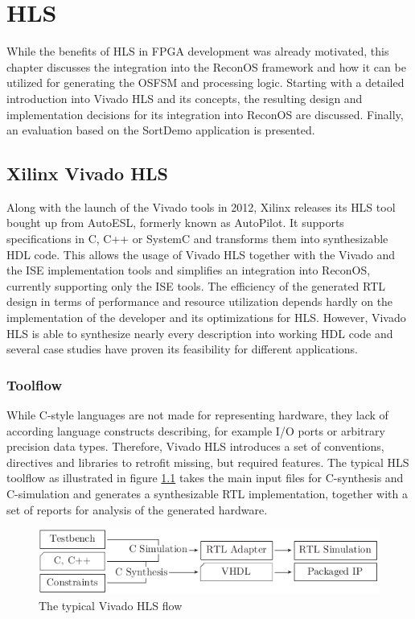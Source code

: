 \chapter{\acl{HLS}}
\label{sec:hls}
While the benefits of \ac{HLS} in \ac{FPGA} development was already motivated,
this chapter discusses the integration into the ReconOS framework and how it
can be utilized for generating the \ac{OSFSM} and processing logic. Starting
with a detailed introduction into Vivado HLS and its concepts, the resulting
design and implementation decisions for its integration into ReconOS are
discussed. Finally, an evaluation based on the SortDemo application is
presented.

\section{Xilinx Vivado HLS}
Along with the launch of the Vivado tools in 2012, Xilinx releases its
\ac{HLS} tool bought up from AutoESL, formerly known as AutoPilot. It supports
specifications in C, C++ or SystemC and transforms them into synthesizable
\ac{HDL} code. This allows the usage of Vivado \ac{HLS} together with the
Vivado and the ISE implementation tools and simplifies an integration into
ReconOS, currently supporting only the ISE tools. The efficiency of the
generated RTL design in terms of performance and resource utilization depends
hardly on the implementation of the developer and its optimizations for
\ac{HLS}. However, Vivado HLS is able to synthesize nearly every description
into working \ac{HDL} code and several case studies \citep{SWL13,OCC14} have
proven its feasibility for different applications.

\subsection{Toolflow}
While C-style languages are not made for representing hardware, they lack of
according language constructs describing, for example I/O ports or arbitrary
precision data types. Therefore, Vivado HLS introduces a set of conventions,
directives and libraries to retrofit missing, but required features. The
typical \ac{HLS} toolflow as illustrated in figure \ref{fig:hls_flow} takes
the main input files for C-synthesis and C-simulation and generates a
synthesizable \ac{RTL} implementation, together with a set of reports for
analysis of the generated hardware.
\begin{figure}[tb]
	\centering
	\includegraphics{../figures/hls_flow}
	\caption{The typical Vivado HLS flow \citep[adapted from][]{ug902}}
	\label{fig:hls_flow}
\end{figure}

